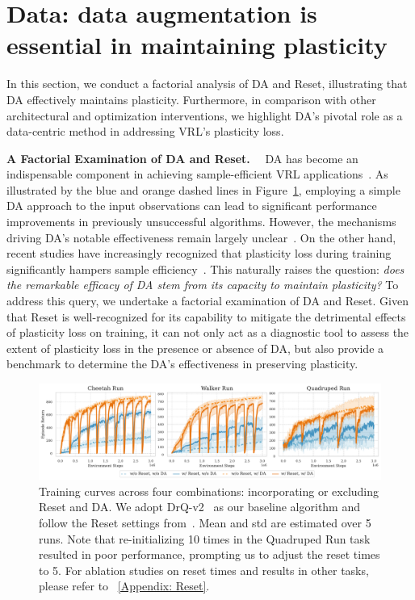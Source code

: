 \section{\textbf{Data:} data augmentation is essential in maintaining plasticity}
\label{Sec: Data}

In this section, we conduct a factorial analysis of DA and Reset, illustrating that DA effectively maintains plasticity.
Furthermore, in comparison with other architectural and optimization interventions, we highlight DA's pivotal role as a data-centric method in addressing VRL's plasticity loss.

\textbf{A Factorial Examination of DA and Reset.}~~
DA has become an indispensable component in achieving sample-efficient VRL applications~\citep{drq, RAD, DrQ-v2, ma2022comprehensive}.
As illustrated by the blue and orange dashed lines in Figure~\ref{Fig:Reset}, employing a simple DA approach to the input observations can lead to significant performance improvements in previously unsuccessful algorithms.
However, the mechanisms driving DA's notable effectiveness remain largely unclear~\citep{ma2023learning}.
On the other hand, recent studies have increasingly recognized that plasticity loss during training significantly hampers sample efficiency~\citep{primacy_bias, dormant_neuron, understanding_plasticity}.
This naturally raises the question: \textit{does the remarkable efficacy of DA stem from its capacity to maintain plasticity?}
To address this query, we undertake a factorial examination of DA and Reset.
Given that Reset is well-recognized for its capability to mitigate the detrimental effects of plasticity loss on training, it can not only act as a diagnostic tool to assess the extent of plasticity loss in the presence or absence of DA, but also provide a benchmark to determine the DA's effectiveness in preserving plasticity.

\begin{figure}[ht]
  \centering
  \vspace{-1\baselineskip}
  \includegraphics[width=\textwidth]{Figures/1Data/reset_DA_Run.pdf}
  \vspace{-2\baselineskip}
  \caption{Training curves across four combinations: incorporating or excluding Reset and DA.
  We adopt DrQ-v2~\citep{DrQ-v2} as our baseline algorithm and follow the Reset settings from~\cite{primacy_bias}.
  Mean and std are estimated over 5 runs.
  Note that re-initializing 10 times in the Quadruped Run task resulted in poor performance, prompting us to adjust the reset times to 5.
  For ablation studies on reset times and results in other tasks, please refer to \Appendix~\ref{Appendix: Reset}.
  }
  \label{Fig:Reset}
\end{figure}

